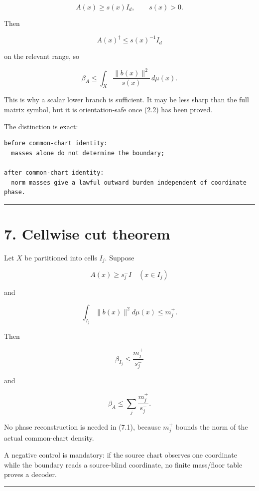 \[
A(x)\ge s(x)I_d,
\qquad
s(x)>0.
\]

Then

\[
A(x)^\dagger\le s(x)^{-1}I_d
\]

on the relevant range, so

\[
\boxed{
\beta_A
\le
\int_X\frac{\|b(x)\|^2}{s(x)}\,d\mu(x).
}
\tag{6.1}
\]

This is why a scalar lower branch is sufficient. It may be less sharp than the
full matrix symbol, but it is orientation-safe once (2.2) has been proved.

The distinction is exact:

\begin{verbatim}
before common-chart identity:
  masses alone do not determine the boundary;

after common-chart identity:
  norm masses give a lawful outward burden independent of coordinate phase.
\end{verbatim}

\begin{center}\rule{0.5\linewidth}{0.5pt}\end{center}

\hypertarget{cellwise-cut-theorem}{%
\section{7. Cellwise cut theorem}\label{cellwise-cut-theorem}}

Let \(X\) be partitioned into cells \(I_j\). Suppose

\[
A(x)\ge s_j^- I
\quad(x\in I_j)
\]

and

\[
\int_{I_j}\|b(x)\|^2d\mu(x)
\le m_j^+.
\]

Then

\[
\boxed{
\beta_{I_j}
\le
\frac{m_j^+}{s_j^-}
}
\]

and

\[
\boxed{
\beta_A
\le
\sum_j\frac{m_j^+}{s_j^-}.
}
\tag{7.1}
\]

No phase reconstruction is needed in (7.1), because \(m_j^+\) bounds the norm
of the actual common-chart density.

A negative control is mandatory: if the source chart observes one coordinate
while the boundary reads a source-blind coordinate, no finite mass/floor table
proves a decoder.

\begin{center}\rule{0.5\linewidth}{0.5pt}\end{center}

